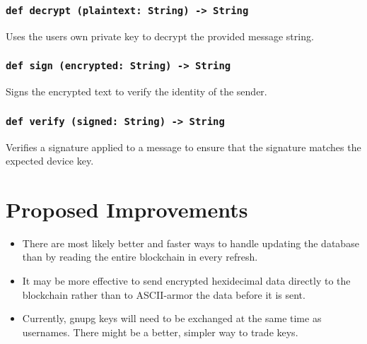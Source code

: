 \documentclass[]{article}
\begin{document}
\subsubsection{\texttt{def decrypt (plaintext: String) -> String}}
Uses the users own private key to decrypt the provided message string.
\subsubsection{\texttt{def sign (encrypted: String) -> String}}
Signs the encrypted text to verify the identity of the sender.
\subsubsection{\texttt{def verify (signed: String) -> String}}
Verifies a signature applied to a message to ensure that the signature matches the expected device key.

\section{Proposed Improvements}
\begin{itemize}
  \item There are most likely better and faster ways to handle updating the database than by reading the entire blockchain in every refresh.
  \item It may be more effective to send encrypted hexidecimal data directly to the blockchain rather than to ASCII-armor the data before it is sent.
  \item Currently, gnupg keys will need to be exchanged at the same time as usernames. There might be a better, simpler way to trade keys. 
\end{itemize}

\pagebreak

  \printbibliography{}
\end{document}
